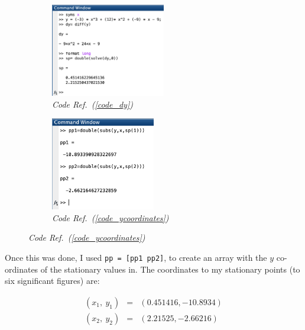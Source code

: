 \documentclass[10pt,a4paper]{article}
\newcommand{\code}[1]{\colorbox{light-gray}{\texttt{#1}}}
\begin{document}
	\begin{figure}[h!]
		\begin{subfigure}{0.5\textwidth}
			\label{fig_statpts}
			\begin{center}
				\includegraphics[width=0.55\textwidth]{a_screenshot.png}
			\end{center}
			\caption{\textit{Code Ref.~(\ref{code_dy})}}
		\end{subfigure}
		\begin{subfigure}{0.5\textwidth}
				\label{fig_statpts_yco}
				\begin{center}
					\includegraphics[width=0.5\textwidth]{a_screenshot2.png}
				\end{center}
				\caption{\textit{Code Ref.~(\ref{code_ycoordinates})}}
		\end{subfigure}
	\end{figure}

	\begin{flushleft}
	Once this was done, I used \code{pp = [pp1 pp2]}, to create an array with the $y$ co-ordinates of the stationary values in. The coordinates to my stationary points (to six significant figures) are:
	\end{flushleft}
	\begin{equation}
	\label{the_stationary_points}
	\begin{array}{rcl}
	(x_1,\ y_1) & = & (0.451416, -10.8934) \\
	(x_2,\ y_2) & = & (2.21525, -2.66216) 
	\end{array}
	\end{equation}
\end{document}
